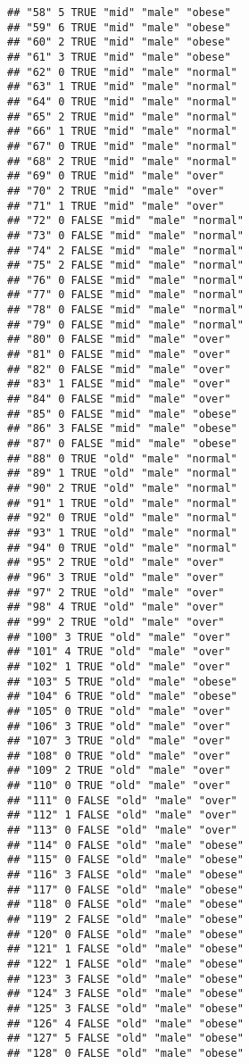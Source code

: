 \documentclass[]{article}
\begin{document}
\begin{verbatim}
## "58" 5 TRUE "mid" "male" "obese"
## "59" 6 TRUE "mid" "male" "obese"
## "60" 2 TRUE "mid" "male" "obese"
## "61" 3 TRUE "mid" "male" "obese"
## "62" 0 TRUE "mid" "male" "normal"
## "63" 1 TRUE "mid" "male" "normal"
## "64" 0 TRUE "mid" "male" "normal"
## "65" 2 TRUE "mid" "male" "normal"
## "66" 1 TRUE "mid" "male" "normal"
## "67" 0 TRUE "mid" "male" "normal"
## "68" 2 TRUE "mid" "male" "normal"
## "69" 0 TRUE "mid" "male" "over"
## "70" 2 TRUE "mid" "male" "over"
## "71" 1 TRUE "mid" "male" "over"
## "72" 0 FALSE "mid" "male" "normal"
## "73" 0 FALSE "mid" "male" "normal"
## "74" 2 FALSE "mid" "male" "normal"
## "75" 2 FALSE "mid" "male" "normal"
## "76" 0 FALSE "mid" "male" "normal"
## "77" 0 FALSE "mid" "male" "normal"
## "78" 0 FALSE "mid" "male" "normal"
## "79" 0 FALSE "mid" "male" "normal"
## "80" 0 FALSE "mid" "male" "over"
## "81" 0 FALSE "mid" "male" "over"
## "82" 0 FALSE "mid" "male" "over"
## "83" 1 FALSE "mid" "male" "over"
## "84" 0 FALSE "mid" "male" "over"
## "85" 0 FALSE "mid" "male" "obese"
## "86" 3 FALSE "mid" "male" "obese"
## "87" 0 FALSE "mid" "male" "obese"
## "88" 0 TRUE "old" "male" "normal"
## "89" 1 TRUE "old" "male" "normal"
## "90" 2 TRUE "old" "male" "normal"
## "91" 1 TRUE "old" "male" "normal"
## "92" 0 TRUE "old" "male" "normal"
## "93" 1 TRUE "old" "male" "normal"
## "94" 0 TRUE "old" "male" "normal"
## "95" 2 TRUE "old" "male" "over"
## "96" 3 TRUE "old" "male" "over"
## "97" 2 TRUE "old" "male" "over"
## "98" 4 TRUE "old" "male" "over"
## "99" 2 TRUE "old" "male" "over"
## "100" 3 TRUE "old" "male" "over"
## "101" 4 TRUE "old" "male" "over"
## "102" 1 TRUE "old" "male" "over"
## "103" 5 TRUE "old" "male" "obese"
## "104" 6 TRUE "old" "male" "obese"
## "105" 0 TRUE "old" "male" "over"
## "106" 3 TRUE "old" "male" "over"
## "107" 3 TRUE "old" "male" "over"
## "108" 0 TRUE "old" "male" "over"
## "109" 2 TRUE "old" "male" "over"
## "110" 0 TRUE "old" "male" "over"
## "111" 0 FALSE "old" "male" "over"
## "112" 1 FALSE "old" "male" "over"
## "113" 0 FALSE "old" "male" "over"
## "114" 0 FALSE "old" "male" "obese"
## "115" 0 FALSE "old" "male" "obese"
## "116" 3 FALSE "old" "male" "obese"
## "117" 0 FALSE "old" "male" "obese"
## "118" 0 FALSE "old" "male" "obese"
## "119" 2 FALSE "old" "male" "obese"
## "120" 0 FALSE "old" "male" "obese"
## "121" 1 FALSE "old" "male" "obese"
## "122" 1 FALSE "old" "male" "obese"
## "123" 3 FALSE "old" "male" "obese"
## "124" 3 FALSE "old" "male" "obese"
## "125" 3 FALSE "old" "male" "obese"
## "126" 4 FALSE "old" "male" "obese"
## "127" 5 FALSE "old" "male" "obese"
## "128" 0 FALSE "old" "male" "obese"

\end{verbatim}
\end{document}
